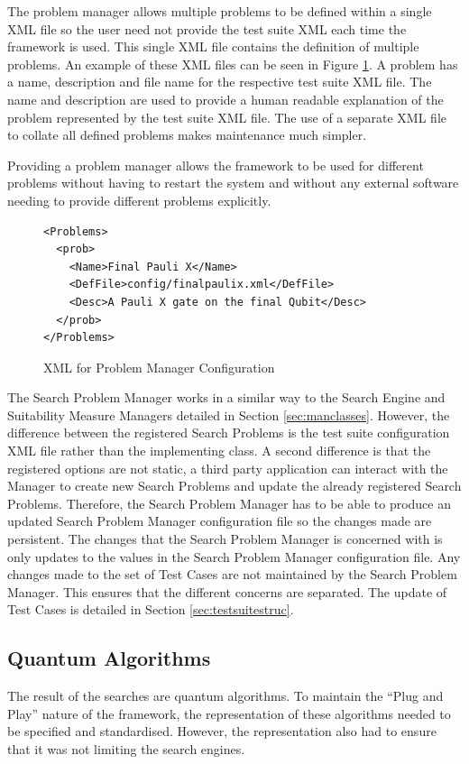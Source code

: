 The problem manager allows multiple problems to be defined within a single XML file so the user need not provide the test suite XML each time the framework is used.
This single XML file contains the definition of multiple problems.
An example of these XML files can be seen in Figure \ref{code:probmanconfig}.
A problem has a name, description and file name for the respective test suite XML file.
The name and description are used to provide a human readable explanation of the problem represented by the test suite XML file.
The use of a separate XML file to collate all defined problems makes maintenance much simpler.

Providing a problem manager allows the framework to be used for different problems without having to restart the system and without any external software needing to provide different problems explicitly.

\lstset{language=XML}
\begin{figure}
\begin{lstlisting}
<Problems>
  <prob>
    <Name>Final Pauli X</Name>
    <DefFile>config/finalpaulix.xml</DefFile>
    <Desc>A Pauli X gate on the final Qubit</Desc>
  </prob>
</Problems>
\end{lstlisting}
\caption{XML for Problem Manager Configuration}
\label{code:probmanconfig}
\end{figure}

The Search Problem Manager works in a similar way to the Search Engine and Suitability Measure Managers detailed in Section \ref{sec:manclasses}.
However, the difference between the registered Search Problems is the test suite configuration XML file rather than the implementing class.
A second difference is that the registered options are not static, a third party application can interact with the Manager to create new Search Problems and update the already registered Search Problems.
Therefore, the Search Problem Manager has to be able to produce an updated Search Problem Manager configuration file so the changes made are persistent.
The changes that the Search Problem Manager is concerned with is only updates to the values in the Search Problem Manager configuration file.
Any changes made to the set of Test Cases are not maintained by the Search Problem Manager.
This ensures that the different concerns are separated.
The update of Test Cases is detailed in Section \ref{sec:testsuitestruc}.

\subsection{Quantum Algorithms}
\label{sec:quantalgs}
The result of the searches are quantum algorithms.
To maintain the ``Plug and Play'' nature of the framework, the representation of these algorithms needed to be specified and standardised.
However, the representation also had to ensure that it was not limiting the search engines.

